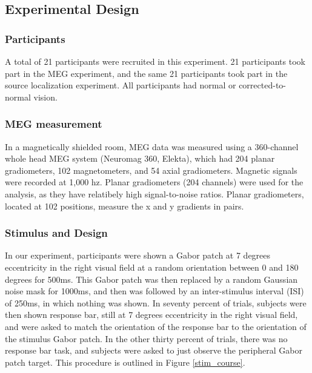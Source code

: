 \documentclass[../main.tex]{subfiles}
\begin{document}
\subsection{Experimental Design}
\subsubsection{Participants}
A total of 21 participants were recruited in this experiment. 21 participants took part in the MEG experiment, and the same 21 participants took part in the source localization experiment. All participants had normal or corrected-to-normal vision.

\subsubsection{MEG measurement}
In a magnetically shielded room, MEG data was measured using a 360-channel whole head MEG system (Neuromag 360, Elekta), which had 204 planar gradiometers, 102 magnetometers, and 54 axial gradiometers. Magnetic signals were recorded at 1,000 hz. Planar gradiometers (204 channels) were used for the analysis, as they have relatibely high signal-to-noise ratios. Planar gradiometers, located at 102 positions, measure the x and y gradients in pairs.

\subsubsection{Stimulus and Design}
In our experiment, participants were shown a Gabor patch at 7 degrees eccentricity in the right visual field at a random orientation between 0 and 180 degrees for 500ms. This Gabor patch was then replaced by a random Gaussian noise mask for 1000ms, and then was followed by an inter-stimulus interval (ISI) of 250ms, in which nothing was shown. In seventy percent of trials, subjects were then shown response bar, still at 7 degrees eccentricity in the right visual field, and were asked to match the orientation of the response bar to the orientation of the stimulus Gabor patch. In the other thirty percent of trials, there was no response bar task, and subjects were asked to just observe the peripheral Gabor patch target. This procedure is outlined in Figure \ref{stim_course}.
\end{document}

